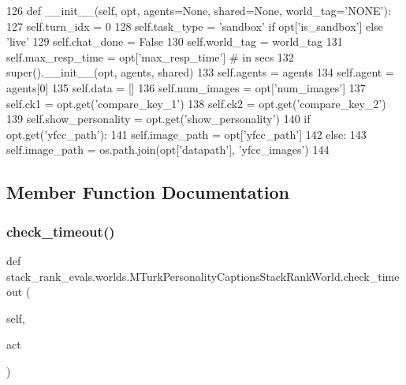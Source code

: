 \begin{DoxyCode}
126     \textcolor{keyword}{def }\_\_init\_\_(self, opt, agents=None, shared=None, world\_tag='NONE'):
127         self.turn\_idx = 0
128         self.task\_type = \textcolor{stringliteral}{'sandbox'} \textcolor{keywordflow}{if} opt[\textcolor{stringliteral}{'is\_sandbox'}] \textcolor{keywordflow}{else} \textcolor{stringliteral}{'live'}
129         self.chat\_done = \textcolor{keyword}{False}
130         self.world\_tag = world\_tag
131         self.max\_resp\_time = opt[\textcolor{stringliteral}{'max\_resp\_time'}]  \textcolor{comment}{# in secs}
132         super().\_\_init\_\_(opt, agents, shared)
133         self.agents = agents
134         self.agent = agents[0]
135         self.data = []
136         self.num\_images = opt[\textcolor{stringliteral}{'num\_images'}]
137         self.ck1 = opt.get(\textcolor{stringliteral}{'compare\_key\_1'})
138         self.ck2 = opt.get(\textcolor{stringliteral}{'compare\_key\_2'})
139         self.show\_personality = opt.get(\textcolor{stringliteral}{'show\_personality'})
140         \textcolor{keywordflow}{if} opt.get(\textcolor{stringliteral}{'yfcc\_path'}):
141             self.image\_path = opt[\textcolor{stringliteral}{'yfcc\_path'}]
142         \textcolor{keywordflow}{else}:
143             self.image\_path = os.path.join(opt[\textcolor{stringliteral}{'datapath'}], \textcolor{stringliteral}{'yfcc\_images'})
144 
\end{DoxyCode}


\subsection{Member Function Documentation}
\mbox{\label{classstack__rank__evals_1_1worlds_1_1MTurkPersonalityCaptionsStackRankWorld_a60ac9e09fd5c55d81fafc0a86794716b}} 
\subsubsection{\texorpdfstring{check\+\_\+timeout()}{check\_timeout()}}
{\footnotesize\ttfamily def stack\+\_\+rank\+\_\+evals.\+worlds.\+M\+Turk\+Personality\+Captions\+Stack\+Rank\+World.\+check\+\_\+timeout (\begin{DoxyParamCaption}\item[{}]{self,  }\item[{}]{act }\end{DoxyParamCaption})}



